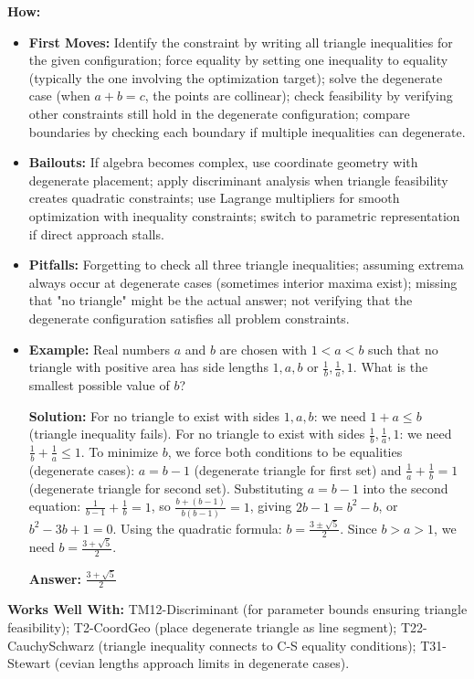 \documentclass[12pt]{article}
\begin{document}
\textbf{How:}
\begin{itemize}
    \item \textbf{First Moves:} Identify the constraint by writing all triangle inequalities for the given configuration; force equality by setting one inequality to equality (typically the one involving the optimization target); solve the degenerate case (when $a + b = c$, the points are collinear); check feasibility by verifying other constraints still hold in the degenerate configuration; compare boundaries by checking each boundary if multiple inequalities can degenerate.
    \item \textbf{Bailouts:} If algebra becomes complex, use coordinate geometry with degenerate placement; apply discriminant analysis when triangle feasibility creates quadratic constraints; use Lagrange multipliers for smooth optimization with inequality constraints; switch to parametric representation if direct approach stalls.
    \item \textbf{Pitfalls:} Forgetting to check all three triangle inequalities; assuming extrema always occur at degenerate cases (sometimes interior maxima exist); missing that "no triangle" might be the actual answer; not verifying that the degenerate configuration satisfies all problem constraints.
    \item \textbf{Example:} Real numbers $a$ and $b$ are chosen with $1 < a < b$ such that no triangle with positive area has side lengths $1, a, b$ or $\frac{1}{b}, \frac{1}{a}, 1$. What is the smallest possible value of $b$?
    
    \textbf{Solution:} For no triangle to exist with sides $1, a, b$: we need $1 + a \leq b$ (triangle inequality fails). For no triangle to exist with sides $\frac{1}{b}, \frac{1}{a}, 1$: we need $\frac{1}{b} + \frac{1}{a} \leq 1$. To minimize $b$, we force both conditions to be equalities (degenerate cases): $a = b - 1$ (degenerate triangle for first set) and $\frac{1}{a} + \frac{1}{b} = 1$ (degenerate triangle for second set). Substituting $a = b - 1$ into the second equation: $\frac{1}{b-1} + \frac{1}{b} = 1$, so $\frac{b + (b-1)}{b(b-1)} = 1$, giving $2b - 1 = b^2 - b$, or $b^2 - 3b + 1 = 0$. Using the quadratic formula: $b = \frac{3 \pm \sqrt{5}}{2}$. Since $b > a > 1$, we need $b = \frac{3 + \sqrt{5}}{2}$.
    
    \textbf{Answer:} $\frac{3 + \sqrt{5}}{2}$
\end{itemize}

\textbf{Works Well With:} TM12-Discriminant (for parameter bounds ensuring triangle feasibility); T2-CoordGeo (place degenerate triangle as line segment); T22-CauchySchwarz (triangle inequality connects to C-S equality conditions); T31-Stewart (cevian lengths approach limits in degenerate cases).
\end{document}
